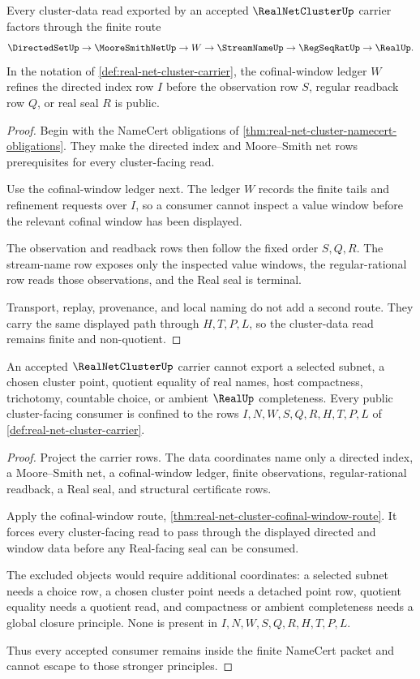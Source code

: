 \begin{theorem}
\label{thm:real-net-cluster-cofinal-window-route}
Every cluster-data read exported by an accepted $\RealNetClusterUp$ carrier factors through the finite route
$$
\DirectedSetUp \to \MooreSmithNetUp \to W \to \StreamNameUp \to \RegSeqRatUp \to \RealUp .
$$
In the notation of \autoref{def:real-net-cluster-carrier}, the cofinal-window ledger $W$ refines the directed index row $I$ before the observation row $S$, regular readback row $Q$, or real seal $R$ is public.
\end{theorem}
\begin{proof}
Begin with the NameCert obligations of \autoref{thm:real-net-cluster-namecert-obligations}. They make the directed index and Moore--Smith net rows prerequisites for every cluster-facing read.

Use the cofinal-window ledger next. The ledger $W$ records the finite tails and refinement requests over $I$, so a consumer cannot inspect a value window before the relevant cofinal window has been displayed.

The observation and readback rows then follow the fixed order $S,Q,R$. The stream-name row exposes only the inspected value windows, the regular-rational row reads those observations, and the Real seal is terminal.

Transport, replay, provenance, and local naming do not add a second route. They carry the same displayed path through $H,T,P,L$, so the cluster-data read remains finite and non-quotient.
\end{proof}

\begin{theorem}
\label{thm:real-net-cluster-nonescape}
An accepted $\RealNetClusterUp$ carrier cannot export a selected subnet, a chosen cluster point, quotient equality of real names, host compactness, trichotomy, countable choice, or ambient $\RealUp$ completeness. Every public cluster-facing consumer is confined to the rows $I,N,W,S,Q,R,H,T,P,L$ of \autoref{def:real-net-cluster-carrier}.
\end{theorem}
\begin{proof}
Project the carrier rows. The data coordinates name only a directed index, a Moore--Smith net, a cofinal-window ledger, finite observations, regular-rational readback, a Real seal, and structural certificate rows.

Apply the cofinal-window route, \autoref{thm:real-net-cluster-cofinal-window-route}. It forces every cluster-facing read to pass through the displayed directed and window data before any Real-facing seal can be consumed.

The excluded objects would require additional coordinates: a selected subnet needs a choice row, a chosen cluster point needs a detached point row, quotient equality needs a quotient read, and compactness or ambient completeness needs a global closure principle. None is present in $I,N,W,S,Q,R,H,T,P,L$.

Thus every accepted consumer remains inside the finite NameCert packet and cannot escape to those stronger principles.
\end{proof}

